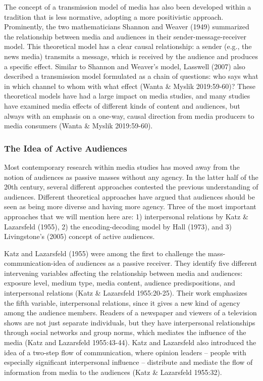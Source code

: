 \documentclass[
]{article}
\begin{document}
The concept of a transmission model of media has also been developed
within a tradition that is less normative, adopting a more positivistic
approach. Prominently, the two mathematicians Shannon and Weaver (1949)
summarized the relationship between media and audiences in their
sender-message-receiver model. This theoretical model has a clear causal
relationship: a sender (e.g., the news media) transmits a message, which
is received by the audience and produces a specific effect. Similar to
Shannon and Weaver's model, Lasswell (2007) also described a
transmission model formulated as a chain of questions: who says what in
which channel to whom with what effect (Wanta \& Myslik 2019:59-60)?
These theoretical models have had a large impact on media studies, and
many studies have examined media effects of different kinds of content
and audiences, but always with an emphasis on a one-way, causal
direction from media producers to media consumers (Wanta \& Myslik
2019:59-60).

\hypertarget{the-idea-of-active-audiences}{%
\subsubsection{The Idea of Active
Audiences}\label{the-idea-of-active-audiences}}

\noindent Most contemporary research within media studies has moved away
from the notion of audiences as passive masses without any agency. In
the latter half of the 20th century, several different approaches
contested the previous understanding of audiences. Different theoretical
approaches have argued that audiences should be seen as being more
diverse and having more agency. Three of the most important approaches
that we will mention here are: 1) interpersonal relations by Katz \&
Lazarsfeld (1955), 2) the encoding-decoding model by Hall (1973), and 3)
Livingstone's (2005) concept of active audiences.

Katz and Lazarsfeld (1955) were among the first to challenge the
mass-communication-idea of audiences as a passive receiver. They
identify five different intervening variables affecting the relationship
between media and audiences: exposure level, medium type, media content,
audience predispositions, and interpersonal relations (Katz \&
Lazarsfeld 1955:20-25). Their work emphasizes the fifth variable,
interpersonal relations, since it gives a new kind of agency among the
audience members. Readers of a newspaper and viewers of a television
shows are not just separate individuals, but they have interpersonal
relationships through social networks and group norms, which mediates
the influence of the media (Katz and Lazarsfeld 1955:43-44). Katz and
Lazarsfeld also introduced the idea of a two-step flow of communication,
where opinion leaders -- people with especially significant
interpersonal influence -- distribute and mediate the flow of
information from media to the audiences (Katz \& Lazarsfeld 1955:32).
\end{document}
